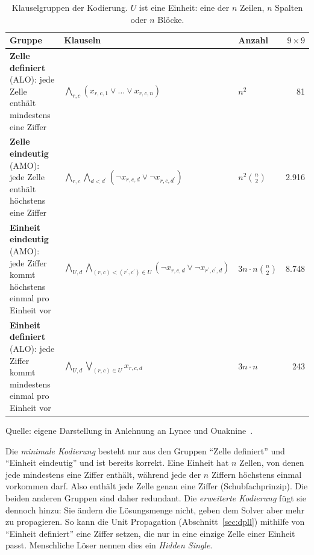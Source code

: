 \begin{table}[htb]
    \centering
    \caption{Klauselgruppen der Kodierung. $U$ ist eine Einheit: eine der $n$ Zeilen, $n$ Spalten oder $n$ Blöcke.}
    \label{tab:clause-groups}
    \small
    \renewcommand{\arraystretch}{1.3}
    \begin{tabularx}{\textwidth}{@{}>{\raggedright\arraybackslash}X l l r@{}}
        \toprule
        Gruppe & Klauseln & Anzahl & $9 \times 9$ \\
        \midrule
        \textbf{Zelle definiert} (\acs{ALO}): jede Zelle enthält mindestens eine Ziffer
            & $\bigwedge_{r,c} (x_{r,c,1} \lor \dots \lor x_{r,c,n})$
            & $n^2$ & 81 \\
        \textbf{Zelle eindeutig} (\acs{AMO}): jede Zelle enthält höchstens eine Ziffer
            & $\bigwedge_{r,c} \bigwedge_{d < d^{\prime}} (\neg x_{r,c,d} \lor \neg x_{r,c,d^{\prime}})$
            & $n^2 \binom{n}{2}$ & 2.916 \\
        \textbf{Einheit eindeutig} (\acs{AMO}): jede Ziffer kommt höchstens einmal pro Einheit vor
            & $\bigwedge_{U,d} \bigwedge_{(r,c) < (r^{\prime},c^{\prime}) \in U} (\neg x_{r,c,d} \lor \neg x_{r^{\prime},c^{\prime},d})$
            & $3n \cdot n \binom{n}{2}$ & 8.748 \\
        \textbf{Einheit definiert} (\acs{ALO}): jede Ziffer kommt mindestens einmal pro Einheit vor
            & $\bigwedge_{U,d} \bigvee_{(r,c) \in U} x_{r,c,d}$
            & $3n \cdot n$ & 243 \\
        \bottomrule
    \end{tabularx}
    \par\smallskip
    {\footnotesize Quelle: eigene Darstellung in Anlehnung an Lynce und Ouaknine~\parencite*[4\psq]{lynce2006}.}
\end{table}

Die \emph{minimale Kodierung} besteht nur aus den Gruppen \enquote{Zelle definiert} und \enquote{Einheit eindeutig} und ist bereits korrekt.
Eine Einheit hat $n$ Zellen, von denen jede mindestens eine Ziffer enthält, während jede der $n$ Ziffern höchstens einmal vorkommen darf.
Also enthält jede Zelle genau eine Ziffer (Schubfachprinzip).
Die beiden anderen Gruppen sind daher redundant.
Die \emph{erweiterte Kodierung} fügt sie dennoch hinzu: Sie ändern die Lösungsmenge nicht, geben dem Solver aber mehr zu propagieren.
So kann die Unit Propagation (Abschnitt~\ref{sec:dpll}) mithilfe von \enquote{Einheit definiert} eine Ziffer setzen, die nur in eine einzige Zelle einer Einheit passt. Menschliche Löser nennen dies ein \emph{Hidden Single}.

